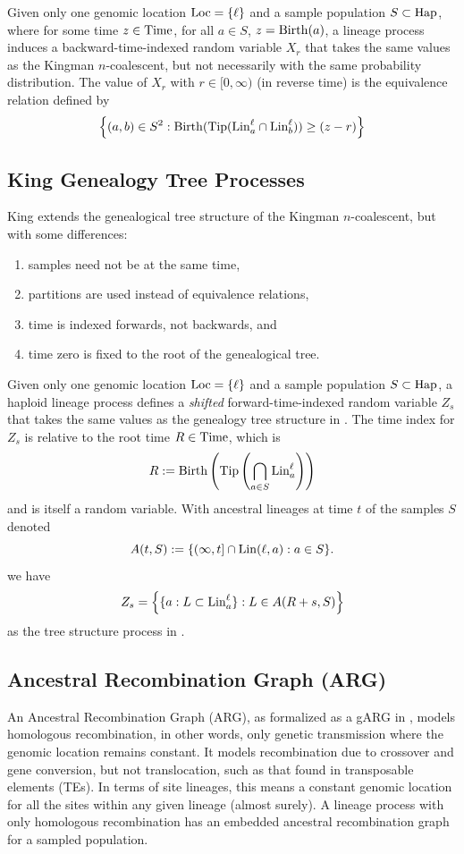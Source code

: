 Given only one genomic location $\mathrm{Loc} = \{ \ell \}$ and a sample population $S \subset \mathrm{Hap}$,
where for some time $z \in \mathrm{Time}$, for all $a \in S$, $z = \mathrm{Birth}(a)$,
a lineage process induces a backward-time-indexed random
variable $X_r$ that takes the same values as the Kingman $n$-coalescent, but not necessarily
with the same probability distribution.
The value of $X_r$ with $r \in [0, \infty)$ (in reverse time)
is the equivalence relation defined by
\[
  \left\{ (a,b) \in S^2 : \mathrm{Birth}(\mathrm{Tip}(\mathrm{Lin}_a^\ell \cap \mathrm{Lin}_b^\ell)) \ge (z - r) \right\}
\]


\subsection{King Genealogy Tree Processes}

King \cite{king_exact_2026} extends the genealogical tree structure of the Kingman
$n$-coalescent, but with some differences:
\begin{enumerate}
  \item samples need not be at the same time,
  \item partitions are used instead of equivalence relations,
  \item time is indexed forwards, not backwards, and
  \item time zero is fixed to the root of the genealogical tree.
\end{enumerate}

Given only one genomic location $\mathrm{Loc} = \{ \ell \}$ and
a sample population $S \subset \mathrm{Hap}$, a haploid
lineage process defines a \emph{shifted} forward-time-indexed random variable
$Z_s$ that takes the same values as the genealogy tree structure in
\cite{king_exact_2026}.
The time index for $Z_s$ is relative to the root time $R \in \mathrm{Time}$, which is
\[
  R := \mathrm{Birth}\left( \mathrm{Tip}\left( \bigcap_{a \in S} \mathrm{Lin}^\ell_a \right) \right)
\]
and is itself a random variable. With ancestral lineages at time $t$
of the samples $S$ denoted
\[
  A(t, S) := \{ (\infty, t] \cap \mathrm{Lin}(\ell,a) : a \in S \}
\text{.}
\]
we have
\[
  Z_s = \left\{ \{ a : L \subset \mathrm{Lin}^\ell_a \} : L \in A(R + s, S) \right\}
\]
as the tree structure process in \cite{king_exact_2026}.


\subsection{Ancestral Recombination Graph (ARG)}

An Ancestral Recombination Graph (ARG), as formalized as a gARG in
\cite{wong_general_2024}, models homologous recombination, in other words, only genetic
transmission where the genomic location remains constant.
It models recombination due to crossover and gene conversion, but not translocation, such
as that found in transposable elements (TEs).
In terms of site lineages, this means a constant genomic location for all the sites within
any given lineage (almost surely).
A lineage process with only homologous recombination
has an embedded
ancestral recombination graph \cite{friedman_ancestral_1997,
hein_gene_2005, wakeley_coalescent_2009} for a sampled
population.

